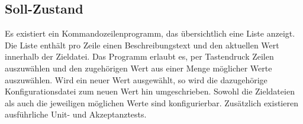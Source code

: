 \subsection{Soll-Zustand}
Es existiert ein Kommandozeilenprogramm, das übersichtlich eine
Liste anzeigt. Die Liste enthält pro Zeile einen Beschreibungstext
und den aktuellen Wert innerhalb der Zieldatei. Das Programm
erlaubt es, per Tastendruck Zeilen auszuwählen und den
zugehörigen Wert aus einer Menge möglicher Werte auszuwählen.
Wird ein neuer Wert ausgewählt, so wird die dazugehörige
Konfigurationsdatei zum neuen Wert hin umgeschrieben. Sowohl die Zieldateien als
auch die jeweiligen möglichen Werte sind konfigurierbar.
Zusätzlich existieren ausführliche Unit- und Akzeptanztests.